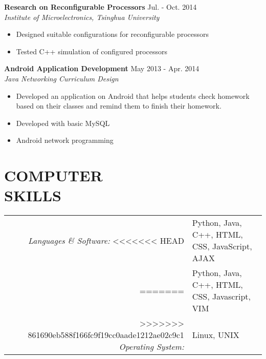 \documentclass[margin,10pt]{res} %
\begin{document}
\begin{resume}
{\bf Research on Reconfigurable Processors} \hfill Jul. - Oct. 2014 \\ 
\textit{Institute of Microelectronics, Tsinghua University}
\begin{itemize}  %
\item Designed suitable configurations for reconfigurable processors
\item Tested C++ simulation of configured processors
\end{itemize}

{\bf Android Application Development} \hfill May 2013 - Apr. 2014 \\
\textit{Java Networking Curriculum Design}
\begin{itemize}
\item Developed an application on Android that helps students check homework based on their classes and remind them to finish their homework.
\item Developed with basic MySQL
\item Android network programming
\end{itemize}


\section{COMPUTER \\ SKILLS}
\begin{tabular}{rl}
{\sl Languages \& Software:}
<<<<<<< HEAD
& Python, Java, C++, HTML, CSS, JavaScript, AJAX \\
=======
& Python, Java, C++, HTML, CSS, Javascript, VIM \\
>>>>>>> 861690eb588f166fc9f19cc0aade1212ae02c9c1
{\sl Operating System:}
& Linux, UNIX\\
\end{tabular}



\end{resume}
\end{document}
